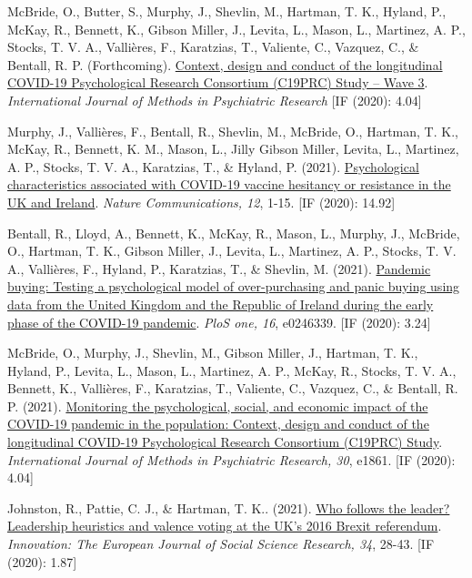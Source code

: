 \documentclass[12pt]{article}
\begin{document}
\begin{bibenum}
	\item McBride, O., Butter, S., Murphy, J., Shevlin, M., Hartman, T. K., 
	Hyland, P., McKay, R., Bennett, K., Gibson Miller, J.,  Levita, L., Mason, L., 
	Martinez, A. P.,  Stocks, T. V. A., Vallières, F., Karatzias, T., Valiente, C., 
	Vazquez, C., \& Bentall, R. P.  (Forthcoming). 
		\href{https://psyarxiv.com/kthfn/}{Context, design and conduct of 
		the longitudinal COVID-19 Psychological Research Consortium 
		(C19PRC) Study – Wave 3}.  
		\emph{International Journal of Methods in Psychiatric Research} [IF (2020): 4.04]
		
	\item Murphy, J., Vallières, F., Bentall, R., Shevlin, M.,  McBride, O., 
	Hartman, T. K., McKay, R., Bennett, K. M., Mason, L., Jilly Gibson Miller,  
	Levita, L., Martinez, A. P., Stocks, T. V. A.,  Karatzias, T., \& Hyland, P. (2021).
		\href{https://doi.org/10.1038/s41467-020-20226-9}{Psychological characteristics 
		associated with COVID-19 vaccine hesitancy or resistance in the UK and Ireland}. 
		\emph{Nature Communications, 12}, 1-15. [IF (2020): 14.92]

	\item Bentall, R., Lloyd, A., Bennett, K., McKay, R., Mason, L., Murphy, J., 
	McBride, O., Hartman, T. K., Gibson Miller, J., Levita, L., Martinez, A. P., 
	Stocks, T. V. A., Vallières, F., Hyland, P., Karatzias, T., \& Shevlin, M. (2021). 
		\href{https://doi.org/10.1371/journal.pone.0246339}{Pandemic buying: 
		Testing a psychological model of over-purchasing and panic buying 
		using data from the United Kingdom and the Republic of Ireland 
		during the early phase of the COVID-19 pandemic}.
		\emph{PloS one, 16}, e0246339. [IF (2020): 3.24]
	
	\item McBride, O., Murphy, J., Shevlin, M., Gibson Miller, J., Hartman, T. K., 
	Hyland, P., Levita, L., Mason, L., Martinez, A. P., McKay, R., Stocks, T. V. A., 
	Bennett, K., Vallières, F., Karatzias, T., Valiente, C., Vazquez, C., \& Bentall, R. P. (2021). 
		\href{https://doi.org/10.1002/mpr.1861}{Monitoring the psychological, 
		social, and economic impact of the COVID-19 pandemic in the population: 
		Context, design and conduct of the longitudinal COVID-19 Psychological 
		Research Consortium (C19PRC) Study}.
		\emph{International Journal of Methods in Psychiatric Research, 30}, e1861. [IF (2020): 4.04]
	
	\item Johnston, R., Pattie, C. J., \& {Hartman, T. K.}. (2021). 
		\href{https://doi.org/10.1080/13511610.2020.1746905}
		{Who follows the leader? Leadership heuristics and valence voting 
		at the UK’s 2016 Brexit referendum}.
		\emph{Innovation: The European Journal of Social Science Research, 34}, 
		28-43. [IF (2020): 1.87]


\end{bibenum}
\end{document}
